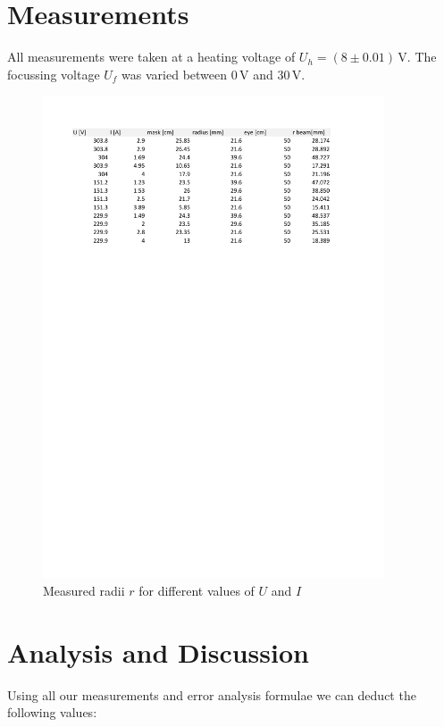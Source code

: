 \documentclass{scrreprt}
\newcommand{\unit}[1]{\ensuremath{\, \mathrm{#1}}}
\begin{document}
\section{Measurements}
All measurements were taken at a heating voltage of $U_h = (8 \pm 0.01) \unit{V}$. The focussing voltage $U_f$ was varied between $0 \unit{V}$ and $30 \unit{V}$.

\begin{figure}[H]
	\centering
  \includegraphics[width=0.9\textwidth]{diag/measurements.pdf}
	\caption{Measured radii $r$ for different values of $U$ and $I$}
	\label{fig:measurements}
\end{figure}

\section{Analysis and Discussion}

Using all our measurements and error analysis formulae we can deduct the following values:
\end{document}
